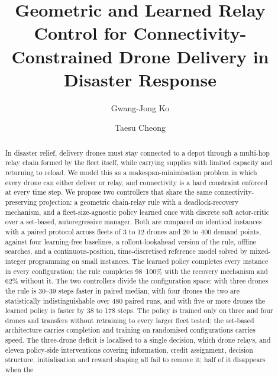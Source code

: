 \documentclass[final,5p,times,twocolumn]{elsarticle}
\begin{document}
\begin{frontmatter}

\title{Geometric and Learned Relay Control for Connectivity-Constrained Drone Delivery in Disaster Response}

\author[ku]{Gwang-Jong Ko}
\author[ku]{Taesu Cheong}

\begin{abstract}
In disaster relief, delivery drones must stay connected to a depot through a multi-hop
relay chain formed by the fleet itself, while carrying supplies with limited capacity and
returning to reload. We model this as a makespan-minimisation problem in which every drone can
either deliver or relay, and connectivity is a hard constraint enforced at every time step. We
propose two controllers that share the same connectivity-preserving projection: a geometric
chain-relay rule with a deadlock-recovery mechanism, and a fleet-size-agnostic policy learned
once with discrete soft actor-critic over a set-based, autoregressive manager. Both are compared
on identical instances with a paired protocol across fleets of 3 to 12 drones and 20 to 400
demand points, against four learning-free baselines, a rollout-lookahead version of the rule,
offline searches, and a continuous-position, time-discretised reference model solved by
mixed-integer programming on small instances. The learned policy completes every instance in every configuration;
the rule completes 98--100\% with the recovery mechanism and 62\% without it. The two
controllers divide the configuration space: with three drones the rule is 30--39 steps
faster in paired median, with four drones the two are statistically indistinguishable over 480 paired runs, and with
five or more drones the learned policy is faster by 38 to 178 steps. The policy is trained only
on three and four drones and transfers without retraining to every larger fleet tested; the
set-based architecture carries completion and training on randomised configurations carries
speed. The three-drone deficit is localised to a single decision, which drone relays, and eleven
policy-side interventions covering information, credit assignment, decision structure,
initialisation and reward shaping all fail to remove it; half of it disappears when the

\end{abstract}
\end{frontmatter}
\end{document}
